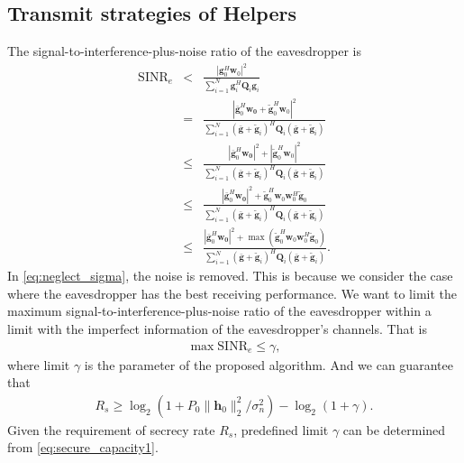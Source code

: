 \documentclass[conference]{IEEEtran}
\begin{document}
\subsection{Transmit strategies of Helpers}
The signal-to-interference-plus-noise ratio of the eavesdropper is
\begin{eqnarray}
\mathrm{SINR}_e & < & \frac{\left| \mathbf{g}_{0}^H\mathbf{w}_{0}\right|^2}{\sum_{i=1}^{N}\mathbf{g}_{i}^H\mathbf{Q}_{i}\mathbf{g}_i} \label{eq:neglect_sigma}\\
&=& \frac{|\bar{\mathbf{g}}_0^H\mathbf{w_0} + \tilde{\mathbf{g}}_0^H\mathbf{w}_0|^2}{\sum_{i = 1}^N(\bar{\mathbf{g}}+\tilde{\mathbf{g}}_i)^H\mathbf{Q}_i(\bar{\mathbf{g}}+\tilde{\mathbf{g}}_i)}\\
&\leq & \frac{|\bar{\mathbf{g}}_0^H\mathbf{w_0}|^2 + |\tilde{\mathbf{g}}_0^H\mathbf{w}_0|^2}{\sum_{i = 1}^N(\bar{\mathbf{g}}+\tilde{\mathbf{g}}_i)^H\mathbf{Q}_i(\bar{\mathbf{g}}+\tilde{\mathbf{g}}_i)}\\
&\leq & \frac{|\bar{\mathbf{g}}_0^H\mathbf{w_0}|^2 + \tilde{\mathbf{g}}_0^H\mathbf{w}_0\mathbf{w}_0^H\tilde{\mathbf{g}}_0}{\sum_{i = 1}^N(\bar{\mathbf{g}}+\tilde{\mathbf{g}}_i)^H\mathbf{Q}_i(\bar{\mathbf{g}}+\tilde{\mathbf{g}}_i)}\\
& \leq & \frac{|\bar{\mathbf{g}}_0^H\mathbf{w_0}|^2 + \max(\tilde{\mathbf{g}}_0^H\mathbf{w}_0\mathbf{w}_0^H\tilde{\mathbf{g}}_0)}{\sum_{i = 1}^N(\bar{\mathbf{g}}+\tilde{\mathbf{g}}_i)^H\mathbf{Q}_i(\bar{\mathbf{g}}+\tilde{\mathbf{g}}_i)} .
\label{eq:SINR_e}
\end{eqnarray}
In \eqref{eq:neglect_sigma}, the noise is removed. This is because we consider the case where the eavesdropper has the best receiving performance. We want to limit the maximum signal-to-interference-plus-noise ratio of the eavesdropper within a limit with the imperfect information of the eavesdropper's channels. That is 
\begin{eqnarray}
\max \mathrm{SINR}_e \leq \gamma \label{eq:SINR_constraint},
\end{eqnarray} 
where limit $\gamma$ is the parameter of the proposed algorithm.
And we can guarantee that
\begin{eqnarray}
R_s \geq \log_2\left(1 + P_0\|\mathbf{h}_0\|_2^2/\sigma_n^2\right) - \log_2\left(1 + \gamma\right). \label{eq:secure_capacity1}
\end{eqnarray}
Given the requirement of secrecy rate $R_s$, predefined limit $\gamma$ can be determined from \eqref{eq:secure_capacity1}.
\end{document}
